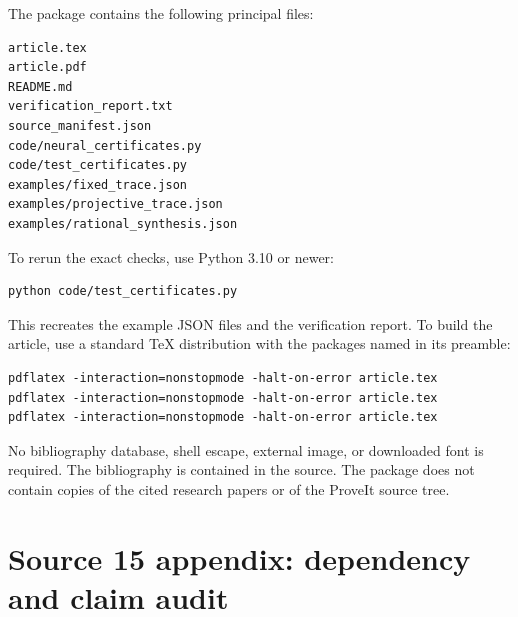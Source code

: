 \documentclass[11pt,letterpaper]{article}
\numberwithin{equation}{section}
\theoremstyle{definition}
\theoremstyle{remark}
\begin{document}
The package contains the following principal files:
\begin{lstlisting}
article.tex
article.pdf
README.md
verification_report.txt
source_manifest.json
code/neural_certificates.py
code/test_certificates.py
examples/fixed_trace.json
examples/projective_trace.json
examples/rational_synthesis.json
\end{lstlisting}
To rerun the exact checks, use Python 3.10 or newer:
\begin{lstlisting}
python code/test_certificates.py
\end{lstlisting}
This recreates the example JSON files and the verification report. To build
the article, use a standard TeX distribution with the packages named in its
preamble:
\begin{lstlisting}
pdflatex -interaction=nonstopmode -halt-on-error article.tex
pdflatex -interaction=nonstopmode -halt-on-error article.tex
pdflatex -interaction=nonstopmode -halt-on-error article.tex
\end{lstlisting}
No bibliography database, shell escape, external image, or downloaded font
is required. The bibliography is contained in the source. The package does
not contain copies of the cited research papers or of the ProveIt source
tree.

\section{Source 15 appendix: dependency and claim audit}
\end{document}
